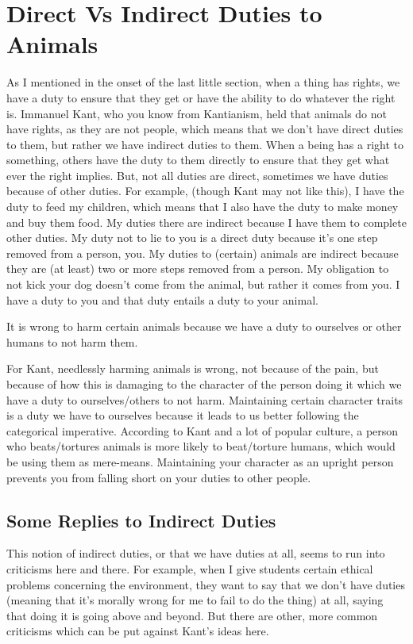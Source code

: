 \section{Direct Vs Indirect Duties to Animals}
As I mentioned in the onset of the last little section, when a thing has rights, we have a duty to ensure that they get or have the ability to do whatever the right is. Immanuel Kant, who you know from Kantianism, held that animals do not have rights, as they are not people, which means that we don't have direct duties to them, but rather we have indirect duties to them. When a being has a right to something, others have the duty to them directly  to ensure that they get what ever the right implies. But, not all duties are direct, sometimes we have duties because of other duties. For example, (though Kant may not like this), I have the duty to feed my children, which means that I also have the duty to make money and buy them food. My duties there are indirect because I have them to complete other duties. My duty not to lie to you is a direct duty because it's one step removed from a person, you. My duties to (certain) animals are indirect because they are (at least) two or more steps removed from a person. My obligation to not kick your dog doesn't come from the animal, but rather it comes from you. I have a duty to you and that duty entails a duty to your animal. 

\begin{center}It is wrong to harm certain animals because we have a duty to ourselves or other humans to not harm them.\end{center}

For Kant, needlessly harming animals is wrong, not because of the pain, but because of how this is damaging to the character of the person doing it which we have a duty to ourselves/others to not harm. Maintaining certain character traits is a duty we have to ourselves because it leads to us better following the categorical imperative.  According to Kant and a lot of popular culture, a person who beats/tortures animals is more likely to beat/torture humans, which would be using them as mere-means. Maintaining your character as an upright person prevents you from falling short on your duties to other people.
\subsection{Some Replies to Indirect Duties}

This notion of indirect duties, or that we have duties at all, seems to run into criticisms here and there. For example, when I give students certain ethical problems concerning the environment, they want to say that we don't have duties (meaning that it's morally wrong for me to fail to do the thing) at all, saying that doing it is going above and beyond. But there are other, more common criticisms which can be put against Kant's ideas here. 
